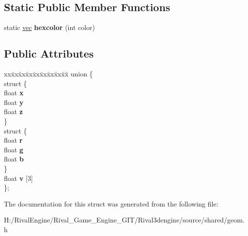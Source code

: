 \subsection*{Static Public Member Functions}
\begin{DoxyCompactItemize}
\item 
\mbox{\label{structvec_a0a9a53578b5ca5a29f7fbf8532fb6d9d}} 
static \hyperlink{structvec}{vec} {\bfseries hexcolor} (int color)
\end{DoxyCompactItemize}
\subsection*{Public Attributes}
\begin{DoxyCompactItemize}
\item 
\mbox{\label{structvec_aa3a84c0325c3a1bfcc0ab78a770fc859}} 
\begin{tabbing}
xx\=xx\=xx\=xx\=xx\=xx\=xx\=xx\=xx\=\kill
union \{\\
\mbox{\label{unionvec_1_1_0D173_a5af70fc817a75337e4a187e3dc4a8936}} 
\>struct \{\\
\>\>float {\bfseries x}\\
\>\>float {\bfseries y}\\
\>\>float {\bfseries z}\\
\>\} \\
\mbox{\label{unionvec_1_1_0D173_a8d5a418f59a7bf1e2b5f18a54ac13b93}} 
\>struct \{\\
\>\>float {\bfseries r}\\
\>\>float {\bfseries g}\\
\>\>float {\bfseries b}\\
\>\} \\
\>float {\bfseries v} \mbox{[}3\mbox{]}\\
\}; \\

\end{tabbing}\end{DoxyCompactItemize}


The documentation for this struct was generated from the following file\+:\begin{DoxyCompactItemize}
\item 
H\+:/\+Rival\+Engine/\+Rival\+\_\+\+Game\+\_\+\+Engine\+\_\+\+G\+I\+T/\+Rival3dengine/source/shared/geom.\+h\end{DoxyCompactItemize}
